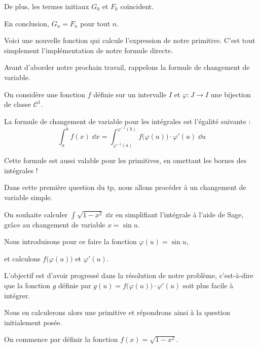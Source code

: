 De plus, les termes initiaux $G_0$ et $F_0$ coïncident.

En conclusion, $G_n=F_n$  pour tout $n$.

\change

Voici une nouvelle fonction qui calcule l'expression de notre primitive.
C'est tout simplement l'implémentation de notre formule directe.


\diapo


Avant d'aborder notre prochain travail, rappelons la formule de changement de variable.

On considère une fonction $f$  définie sur un intervalle $I$ et $\varphi : J \to I$ 
une bijection de classe $\mathcal{C}^1$. 

La formule de changement de variable pour les intégrales est l'égalité suivante :
$$\int_a^b f(x) \; \dd x 
= \int_{\varphi^{-1}(a)}^{\varphi^{-1}(b)} f\big(\varphi(u)\big)\cdot\varphi'(u) \; \dd u$$


Cette formule est aussi valable pour les primitives, en omettant les bornes des intégrales !

\diapo

Dans cette première question du tp, nous allons procéder à un changement de variable simple.

On souhaite calculer $\displaystyle\int \sqrt{1-x^2} \; \dd x$ en simplifiant l'intégrale à l'aide de Sage, grâce au changement de variable $x = \sin u$.

Nous introduisons pour ce faire la fonction $\varphi(u) = \sin u$,

et calculons $f\big( \varphi(u) \big)$ et  $\varphi'(u)$.

L'objectif est d'avoir progressé dans la résolution de notre problème, c'est-à-dire que la fonction $g$ définie par $g(u) = f\big(\varphi(u)\big)\cdot\varphi'(u)$ soit plus facile à intégrer.

Nous en calculerons alors une primitive et répondrons ainsi à la question initialement posée.



\diapo


On commence par définir la fonction $f(x) = \sqrt{1-x^2}$.

